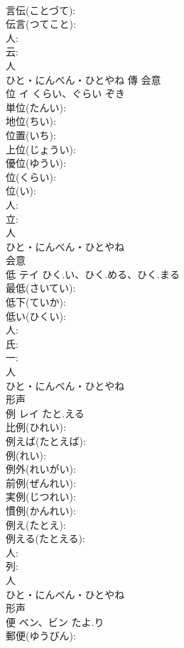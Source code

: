 \documentclass[8pt]{extreport}
\begin{document}
\begin{CJK}{UTF8}{min}
\\	言伝(ことづて): 
\\	伝言(つてこと): 
\\	人: 
\\	云: 
\\	人	
\\	ひと・にんべん・ひとやね	傳	会意 
\\	位	イ	くらい、ぐらい	ぞき	
\\	単位(たんい): 
\\	地位(ちい): 
\\	位置(いち): 
\\	上位(じょうい): 
\\	優位(ゆうい): 
\\	位(くらい): 
\\	位(い): 
\\	人: 
\\	立: 
\\	人	
\\	ひと・にんべん・ひとやね	
\\	会意 
\\	低	テイ	ひく.い、ひく.める、ひく.まる		
\\	最低(さいてい): 
\\	低下(ていか): 
\\	低い(ひくい): 
\\	人: 
\\	氏: 
\\	一: 
\\	人	
\\	ひと・にんべん・ひとやね	
\\	形声 
\\	例	レイ	たと.える		
\\	比例(ひれい): 
\\	例えば(たとえば): 
\\	例(れい): 
\\	例外(れいがい): 
\\	前例(ぜんれい): 
\\	実例(じつれい): 
\\	慣例(かんれい): 
\\	例え(たとえ): 
\\	例える(たとえる): 
\\	人: 
\\	列: 
\\	人	
\\	ひと・にんべん・ひとやね	
\\	形声 
\\	便	ベン、ビン	たよ.り		
\\	郵便(ゆうびん): 

\end{CJK}
\end{document}
